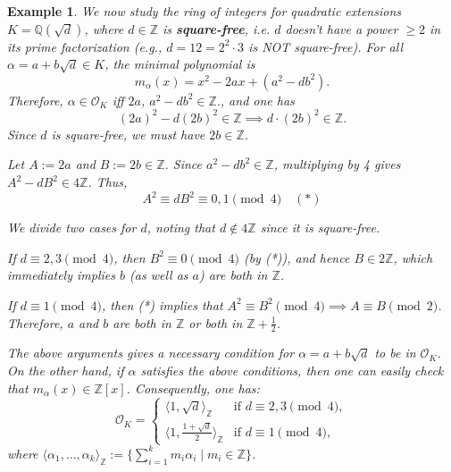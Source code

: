 \documentclass[11pt]{book}
\newtheorem{example}[theorem]{Example}
\begin{document}
\begin{example} \label{eg-quadraticok}
We now study the ring of integers for quadratic extensions $ K = \mathbb{Q}(\sqrt{d}) $, where $ d \in \mathbb{Z} $ is {\bf square-free}, i.e. $ d $ doesn't have a power $ \geq 2 $ in its prime factorization (e.g., $ d = 12 = 2^2 \cdot 3 $ is NOT square-free). For all $ \alpha = a + b\sqrt{d} \in K $, the minimal polynomial is
$$
m_\alpha(x) = x^2 - 2ax + (a^2 - db^2).
$$
Therefore,
$
\alpha \in \mathcal{O}_K$ iff $2a$, $a^2 - db^2 \in \mathbb{Z}.
$, and one has
$$
(2a)^2 - d(2b)^2 \in \mathbb{Z} \implies d \cdot (2b)^2 \in \mathbb{Z}.
$$
Since $ d $ is square-free, we must have $ 2b \in \mathbb{Z} $.  

Let $ A := 2a $ and $ B := 2b \in \mathbb{Z} $. Since $ a^2 - db^2 \in \mathbb{Z} $, multiplying by 4 gives $ A^2 - dB^2 \in 4\mathbb{Z} $. Thus,
$$
A^2 \equiv dB^2 \equiv 0, 1 \pmod{4} \quad (*)
$$

We divide two cases for $d$, noting that $d \notin 4\mathbb{Z}$ since it is square-free.

\smallskip
{} If $ d \equiv 2, 3 \pmod{4} $, then $B^2 \equiv 0 \pmod{4} $ (by (*)), and hence $B \in 2\mathbb{Z}$, which immediately implies $b$ (as well as $a$) are both in $\mathbb{Z}$.

\smallskip
{} If $ d \equiv 1 \pmod{4} $, then (*) implies that $ A^2 \equiv B^2 \pmod{4} \implies A \equiv B \pmod{2} $. Therefore, $ a $ and $ b $ are both in $ \mathbb{Z} $ or both in $ \mathbb{Z} + \frac{1}{2}$.

\smallskip
{} The above arguments gives a necessary condition for $\alpha = a+b\sqrt{d}$ to be in $\mathcal{O}_K$. On the other hand, if $\alpha$ satisfies the above conditions, then one can easily check that $m_{\alpha}(x) \in \mathbb{Z}[x]$. Consequently, one has:
$$
\mathcal{O}_K =
\begin{cases}
\langle 1, \sqrt{d} \rangle_{\mathbb{Z}} & \text{if } d \equiv 2, 3 \pmod{4}, \\
\langle 1, \frac{1+\sqrt{d}}{2} \rangle_{\mathbb{Z}} & \text{if } d \equiv 1 \pmod{4},
\end{cases}
$$
where $ \langle \alpha_1, \dots, \alpha_k \rangle_{\mathbb{Z}} := \{\sum_{i=1}^k m_i \alpha_i \mid m_i \in \mathbb{Z}\} $. %
\end{example}
\end{document}
